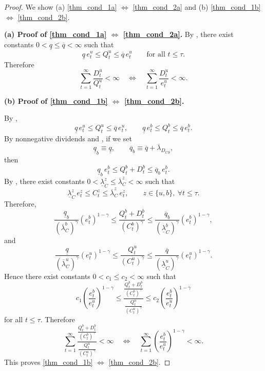 \documentclass[12pt]{article}
\theoremstyle{plain}
\begin{document}
\begin{proof}
We show (a) \eqref{thm_cond_1a} $\Longleftrightarrow$ \eqref{thm_cond_2a} and
(b) \eqref{thm_cond_1b} $\Longleftrightarrow$ \eqref{thm_cond_2b}. 

\medskip
\noindent\textbf{(a) Proof of \eqref{thm_cond_1a} $\Longleftrightarrow$ \eqref{thm_cond_2a}.}
By , there exist constants $0<\underline q\le \overline q<\infty$ such that
\[
\underline q\,e_{t}^u\le Q_{t}^u\le \overline q\,e_{t}^u
\qquad\text{for all }t\le\tau.
\]
Therefore
\[
\sum_{t=1}^\infty \frac{D_t^u}{Q_t^u}<\infty
\quad\Longleftrightarrow\quad
\sum_{t=1}^\infty \frac{D_t^u}{e_{t}^u}<\infty.
\]

\medskip
\noindent\textbf{(b) Proof of \eqref{thm_cond_1b} $\Longleftrightarrow$ \eqref{thm_cond_2b}.}

By ,
\[
\underline q\,e_{t}^u\le Q_t^u\le \overline q\,e_{t}^u,
\qquad
\underline q\,e_{t}^b\le Q_t^b\le \overline q\,e_{t}^b.
\]
By nonnegative dividends and , if we set
\[
\underline q_b\equiv \underline q,
\qquad
\overline q_b\equiv \overline q+\overline\lambda_{D_{US}},
\]
then
\[
\underline q_b\,e_t^b
\le
Q_t^b+D_t^b
\le
\overline q_b\,e_t^b.
\]
By , there exist constants
$0<\underline\lambda_C^z\le \overline\lambda_C^z<\infty$ such that
\[
\underline\lambda_C^z\,e_t^z
\le
C_t^z
\le
\overline\lambda_C^z\,e_t^z,
\qquad
z\in\{u,b\},\ \forall t\le\tau.
\]
Therefore,
\[
\frac{\underline q_b}{(\overline\lambda_C^b)^\gamma}(e_t^b)^{1-\gamma}
\le
\frac{Q_t^b+D_t^b}{(C_t^b)^\gamma}
\le
\frac{\overline q_b}{(\underline\lambda_C^b)^\gamma}(e_t^b)^{1-\gamma},
\]
and
\[
\frac{\underline q}{(\overline\lambda_C^u)^\gamma}(e_t^u)^{1-\gamma}
\le
\frac{Q_t^u}{(C_t^u)^\gamma}
\le
\frac{\overline q}{(\underline\lambda_C^u)^\gamma}(e_t^u)^{1-\gamma}.
\]
Hence there exist constants $0<c_1\le c_2<\infty$ such that
\[
c_1\left(\frac{e_t^b}{e_t^u}\right)^{1-\gamma}
\le
\frac{\frac{Q_t^b+D_t^b}{(C_t^b)^\gamma}}{\frac{Q_t^u}{(C_t^u)^\gamma}}
\le
c_2\left(\frac{e_t^b}{e_t^u}\right)^{1-\gamma}
\]
for all $t\le\tau$. Therefore
\[
\sum_{t=1}^\infty
\frac{\frac{Q_t^b+D_t^b}{(C_t^b)^\gamma}}{\frac{Q_t^u}{(C_t^u)^\gamma}}
<\infty
\quad\Longleftrightarrow\quad
\sum_{t=1}^\infty
\left(\frac{e_t^b}{e_t^u}\right)^{1-\gamma}
<\infty.
\]
This proves \eqref{thm_cond_1b} $\Longleftrightarrow$ \eqref{thm_cond_2b}.
\end{proof}



\appendix


 
\end{document}
